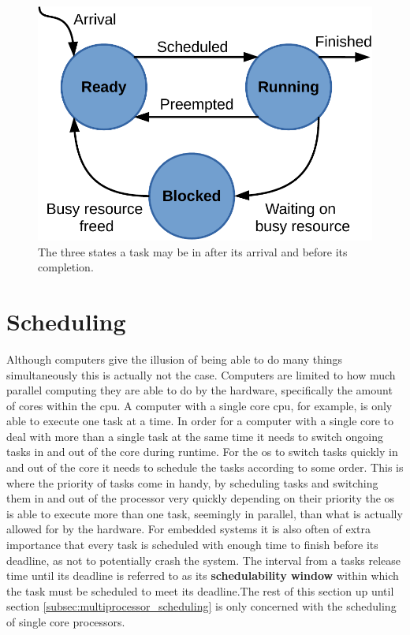 \documentclass{kththesis}
\begin{document}
\begin{figure}

    \centering

    \includegraphics[width=0.7\linewidth]{images/ready-running-blocked-model.pdf}

    \caption{The three states a task may be in after its arrival and before its completion.}

    \label{fig:ready_running_blocked_model}

\end{figure}



\section{Scheduling} \label{sec:scheduling}

Although computers give the illusion of being able to do many things simultaneously this
is actually not the case. Computers are limited to how much parallel computing they are able to do
by the hardware, specifically the amount of cores within the \acrfull{cpu}. A computer with a
single core \acrshort{cpu}, for example, is only able to execute one task at a time. In order for a
computer with a single core to deal with more than a single task at the same time it needs to switch
ongoing tasks in and out of the core during runtime. For the \acrshort{os} to switch tasks quickly
in and out of the core it needs to schedule the tasks according to some order. This is where the
priority of tasks come in handy, by scheduling tasks and switching them in and out of the processor
very quickly depending on their priority the \acrshort{os} is able to execute more than one task,
seemingly in parallel, than what is actually allowed for by the hardware. For embedded systems it is
also often of extra importance that every task is scheduled with enough time to finish before its
deadline, as not to potentially crash the system. The interval from a tasks release time until its
deadline is referred to as its \textbf{schedulability window} within which the task must be
scheduled to meet its deadline.The rest of this section up until section
\ref{subsec:multiprocessor_scheduling} is only concerned with the scheduling of single core
processors.
\end{document}
